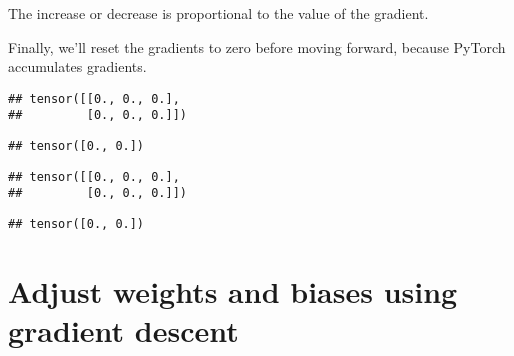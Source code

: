 \documentclass[]{book}
\newenvironment{Shaded}{\begin{snugshade}}{\end{snugshade}}
\newcommand{\CommentTok}[1]{\textcolor[rgb]{0.56,0.35,0.01}{\textit{#1}}}
\newcommand{\KeywordTok}[1]{\textcolor[rgb]{0.13,0.29,0.53}{\textbf{#1}}}
\newcommand{\NormalTok}[1]{#1}
\newcommand{\OperatorTok}[1]{\textcolor[rgb]{0.81,0.36,0.00}{\textbf{#1}}}
\begin{document}
The increase or decrease is proportional to the value of the gradient.

Finally, we'll reset the gradients to zero before moving forward, because PyTorch accumulates gradients.

\begin{Shaded}
\end{Shaded}

\begin{verbatim}
## tensor([[0., 0., 0.],
##         [0., 0., 0.]])
\end{verbatim}

\begin{Shaded}
\end{Shaded}

\begin{verbatim}
## tensor([0., 0.])
\end{verbatim}

\begin{Shaded}
\end{Shaded}

\begin{verbatim}
## tensor([[0., 0., 0.],
##         [0., 0., 0.]])
\end{verbatim}

\begin{Shaded}
\end{Shaded}

\begin{verbatim}
## tensor([0., 0.])
\end{verbatim}

\hypertarget{adjust-weights-and-biases-using-gradient-descent}{%
\section{Adjust weights and biases using gradient descent}\label{adjust-weights-and-biases-using-gradient-descent}}
\end{document}

